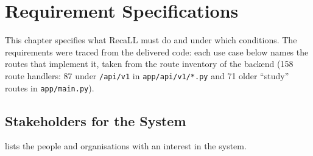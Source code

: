 \chapter{Requirement Specifications}\label{ch:req}

\newcommand{\rclUseCase}[9]{%
\begin{table}[!htbp]
\centering
\small
\caption{Textual description of use case #2: #3}\label{tab:uc#1}\label{uc:#1}
\begin{tabularx}{\textwidth}{@{}>{\bfseries\raggedright\arraybackslash}p{2.7cm} X@{}}
\toprule
Use Case ID & #2\\
Name & #3\\
Actor(s) & #4\\
Precondition & #5\\
Postcondition & #6\\
Main flow & #7\\
Alternative flow & #8\\
Exception flow & #9\\
\bottomrule
\end{tabularx}
\end{table}}

This chapter specifies what RecaLL must do and under which conditions. The requirements
were traced from the delivered code: each use case below names the routes that implement
it, taken from the route inventory of the backend (158 route handlers: 87 under
\texttt{/api/v1} in \texttt{app/api/v1/*.py} and 71 older ``study'' routes in
\texttt{app/main.py}).

\section{Stakeholders for the System}

 lists the people and organisations with an interest in the system.

